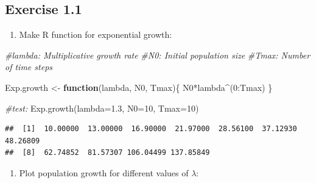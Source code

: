 \documentclass[
]{book}
\newenvironment{Shaded}{\begin{snugshade}}{\end{snugshade}}
\newcommand{\AttributeTok}[1]{\textcolor[rgb]{0.77,0.63,0.00}{#1}}
\newcommand{\CommentTok}[1]{\textcolor[rgb]{0.56,0.35,0.01}{\textit{#1}}}
\newcommand{\ControlFlowTok}[1]{\textcolor[rgb]{0.13,0.29,0.53}{\textbf{#1}}}
\newcommand{\DecValTok}[1]{\textcolor[rgb]{0.00,0.00,0.81}{#1}}
\newcommand{\FloatTok}[1]{\textcolor[rgb]{0.00,0.00,0.81}{#1}}
\newcommand{\FunctionTok}[1]{\textcolor[rgb]{0.00,0.00,0.00}{#1}}
\newcommand{\NormalTok}[1]{#1}
\newcommand{\OtherTok}[1]{\textcolor[rgb]{0.56,0.35,0.01}{#1}}
\newcommand{\SpecialCharTok}[1]{\textcolor[rgb]{0.00,0.00,0.00}{#1}}
\providecommand{\tightlist}{%
  \setlength{\itemsep}{0pt}\setlength{\parskip}{0pt}}
\begin{document}
\hypertarget{exercise-1.1-1}{%
\subsection*{Exercise 1.1}\label{exercise-1.1-1}}

\begin{enumerate}
\def\labelenumi{\arabic{enumi}.}
\tightlist
\item
  Make R function for exponential growth:
\end{enumerate}

\begin{Shaded}
\begin{Highlighting}[]
\CommentTok{\#lambda: Multiplicative growth rate}
\CommentTok{\#N0: Initial population size}
\CommentTok{\#Tmax: Number of time steps}

\NormalTok{Exp.growth }\OtherTok{\textless{}{-}} \ControlFlowTok{function}\NormalTok{(lambda, N0, Tmax)\{}
\NormalTok{        N0}\SpecialCharTok{*}\NormalTok{lambda}\SpecialCharTok{\^{}}\NormalTok{(}\DecValTok{0}\SpecialCharTok{:}\NormalTok{Tmax)}
\NormalTok{\}}

\CommentTok{\#test:}
\FunctionTok{Exp.growth}\NormalTok{(}\AttributeTok{lambda=}\FloatTok{1.3}\NormalTok{, }\AttributeTok{N0=}\DecValTok{10}\NormalTok{, }\AttributeTok{Tmax=}\DecValTok{10}\NormalTok{)        }
\end{Highlighting}
\end{Shaded}

\begin{verbatim}
##  [1]  10.00000  13.00000  16.90000  21.97000  28.56100  37.12930  48.26809
##  [8]  62.74852  81.57307 106.04499 137.85849
\end{verbatim}

\begin{enumerate}
\def\labelenumi{\arabic{enumi}.}
\setcounter{enumi}{1}
\tightlist
\item
  Plot population growth for different values of \(\lambda\):
\end{enumerate}
\end{document}
